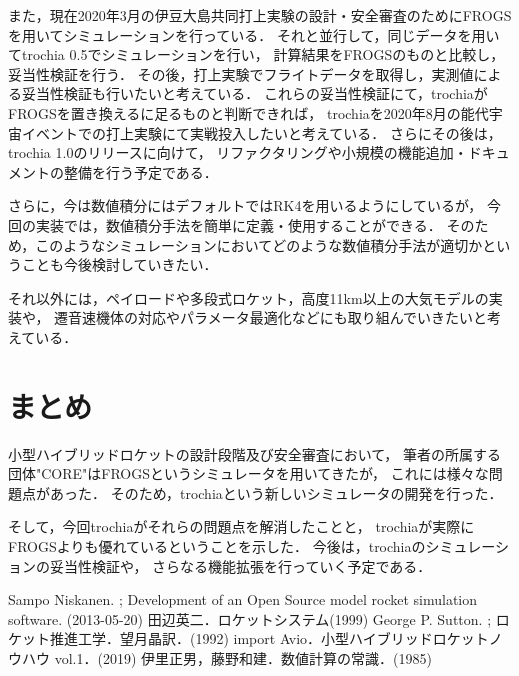 \documentclass[a4j,10pt]{jsarticle}
\begin{document}
また，現在2020年3月の伊豆大島共同打上実験の設計・安全審査のためにFROGSを用いてシミュレーションを行っている．
それと並行して，同じデータを用いてtrochia 0.5でシミュレーションを行い，
計算結果をFROGSのものと比較し，妥当性検証を行う．
その後，打上実験でフライトデータを取得し，実測値による妥当性検証も行いたいと考えている．
これらの妥当性検証にて，trochiaがFROGSを置き換えるに足るものと判断できれば，
trochiaを2020年8月の能代宇宙イベントでの打上実験にて実戦投入したいと考えている．
さらにその後は，trochia 1.0のリリースに向けて，
リファクタリングや小規模の機能追加・ドキュメントの整備を行う予定である．

さらに，今は数値積分にはデフォルトではRK4を用いるようにしているが，
今回の実装では，数値積分手法を簡単に定義・使用することができる．
そのため，このようなシミュレーションにおいてどのような数値積分手法が適切かということも今後検討していきたい．

それ以外には，ペイロードや多段式ロケット，高度11km以上の大気モデルの実装や，
遷音速機体の対応やパラメータ最適化などにも取り組んでいきたいと考えている．

\section{まとめ}

小型ハイブリッドロケットの設計段階及び安全審査において，
筆者の所属する団体"CORE"はFROGSというシミュレータを用いてきたが，
これには様々な問題点があった．
そのため，trochiaという新しいシミュレータの開発を行った．

そして，今回trochiaがそれらの問題点を解消したことと，
trochiaが実際にFROGSよりも優れているということを示した．
今後は，trochiaのシミュレーションの妥当性検証や，
さらなる機能拡張を行っていく予定である．

% 
% 

\begin{thebibliography}{99}
		Sampo Niskanen. ; Development of an Open Source model rocket simulation software. (2013-05-20)
		田辺英二．ロケットシステム(1999)
		George P. Sutton. ; ロケット推進工学．望月晶訳．(1992)
		import Avio．小型ハイブリッドロケットノウハウ vol.1．(2019)
		伊里正男，藤野和建．数値計算の常識．(1985)
\end{thebibliography}
\end{document}
